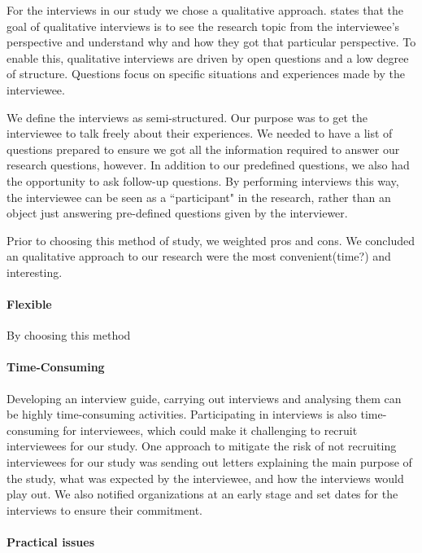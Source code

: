 For the interviews in our study we chose a qualitative approach. \cite{cassell2004essential} states that the goal of qualitative interviews is to see the research topic from the interviewee's perspective and understand why and how they got that particular perspective. To enable this, qualitative interviews are driven by open questions and a low degree of structure. Questions focus on specific situations and experiences made by the interviewee. 

We define the interviews as semi-structured. Our purpose was to get the interviewee to talk freely about their experiences. We needed to have a list of questions prepared to ensure we got all the information required to answer our research questions, however. In addition to our predefined questions, we also had the opportunity to ask follow-up questions. By performing interviews this way, the interviewee can be seen as a ``participant" in the research, rather than an object just answering pre-defined questions given by the interviewer.




Prior to choosing this method of study, we weighted pros and cons. We concluded an qualitative approach to our research were the most convenient(time?) and interesting.
 
\paragraph{Flexible} By choosing this method



\paragraph{Time-Consuming} Developing an interview guide, carrying out interviews and analysing them can be highly time-consuming activities. Participating in interviews is also time-consuming for interviewees, which could make it challenging to recruit interviewees for our study. One approach to mitigate the risk of not recruiting interviewees for our study was sending out letters explaining the main purpose of the study, what was expected by the interviewee, and how the interviews would play out. We also notified organizations at an early stage and set dates for the interviews to ensure their commitment.

\paragraph{Practical issues} 


